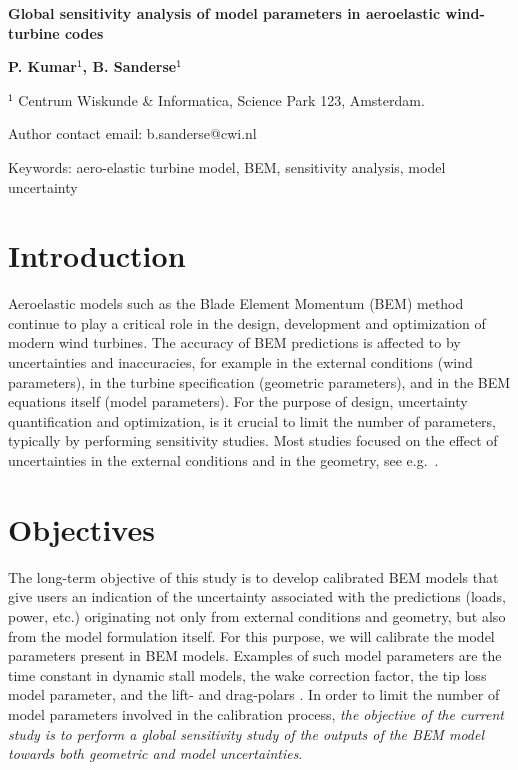\documentclass[11pt]{article}
\begin{document}
\raggedright  %

\vspace*{80pt}
{\LARGE \textbf{Global sensitivity analysis of model parameters in aeroelastic wind-turbine codes}}
\vspace*{28pt}

\begin{addmargin}[2.5cm]{0em}%
\textbf{P. Kumar$^{\boldsymbol{\mathsf{1}}}$, B. Sanderse$^{\boldsymbol{\mathsf{1}}}$}

$^{\mathsf{1}}$ Centrum Wiskunde \& Informatica, Science Park 123, Amsterdam.


Author contact email: b.sanderse@cwi.nl

Keywords: aero-elastic turbine model, BEM, sensitivity analysis, model uncertainty
\end{addmargin}

\section{Introduction}
Aeroelastic models such as the Blade Element Momentum (BEM) method \cite{HandBook} continue to play a critical role in the design, development and optimization of modern wind turbines. The accuracy of BEM predictions is affected to by uncertainties and inaccuracies, for example in the external conditions (wind parameters), in the turbine specification (geometric parameters), and in the BEM equations itself (model parameters). For the purpose of design, uncertainty quantification and optimization, is it crucial to limit the number of parameters, typically by performing sensitivity studies. Most studies focused on the effect of uncertainties in the external conditions and in the geometry, see e.g.\ \cite{Echeverria2017,Matthaus2017,Murcia2018,Robertson2018}.

\section{Objectives}
The long-term objective of this study is to develop calibrated BEM models that give users an indication of the uncertainty associated with the predictions (loads, power, etc.) originating not only from external conditions and geometry, but also from the model formulation itself. For this purpose, we will calibrate the model parameters present in BEM models. Examples of such model parameters are the time constant in dynamic stall models, the wake correction factor, the tip loss model parameter, and the lift- and drag-polars \cite{Sayed2019}. In order to limit the number of model parameters involved in the calibration process, \textit{the objective of the current study is to perform a global sensitivity study of the outputs of the BEM model towards both geometric and model uncertainties}.
\end{document}
